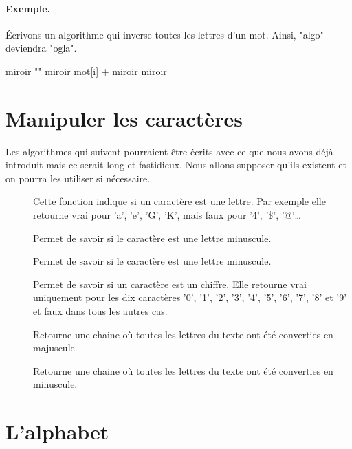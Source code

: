 	\paragraph{Exemple.}
	Écrivons un algorithme qui inverse toutes les lettres d'un mot.
	Ainsi, "algo" deviendra "ogla".
	\begin{LDA}
			\Let miroir \Gets ""
				\Let miroir \Gets mot[i] + miroir
			\EndFor
			\Return miroir
		\EndAlgo
	\end{LDA}
	
\section{Manipuler les caractères}

	Les algorithmes qui suivent pourraient être écrits
	avec ce que nous avons déjà introduit mais ce serait long
	et fastidieux. 
	Nous allons supposer qu'ils existent et on pourra les utiliser
	si nécessaire.
	
	\begin{description}
	\item[]
		Cette fonction indique si un caractère est une lettre. 
		Par exemple elle retourne vrai pour 'a', 'e', 'G', 'K', 
		mais faux pour '4', '\$', '@'\dots %
	\item[]	
		Permet de savoir si le caractère est une lettre minuscule.
	\item[]	
		Permet de savoir si le caractère est une lettre minuscule.
	\item[]	
		Permet de savoir si un caractère est un chiffre. 
		Elle retourne vrai uniquement pour les dix caractères 
		'0', '1', '2', '3', '4', '5', '6', '7', '8' et '9' 
		et faux dans tous les autres cas.
	\item[]
		Retourne une chaine où toutes les lettres du texte
		ont été converties en majuscule.
	\item[]
		Retourne une chaine où toutes les lettres du texte
		ont été converties en minuscule.
	\end{description}
	
\section{L'alphabet}

